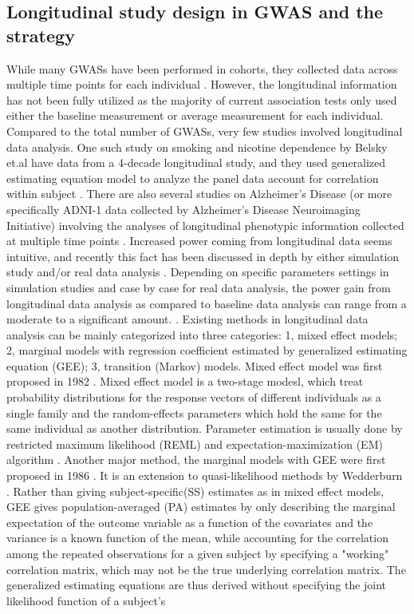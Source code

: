 \documentclass[12pt]{article}
\begin{document}
\subsection*{Longitudinal study design in GWAS and the strategy}
While many GWASs have been performed in cohorts, they collected data across multiple time points for each individual \cite{Aulchenko2009,Ionita-Laza2007,Kamatani2010,Kathiresan2007,Sabatti2008}. However, the longitudinal information has not been fully utilized as the majority of current association tests only used either the baseline measurement or average measurement for each individual\cite{Sabatti2008,Ionita-Laza2007,Kamatani2010,Kathiresan2007}. Compared to the total number of GWASs, very few studies involved longitudinal data analysis. One such study on smoking and nicotine dependence by Belsky et.al have data from a 4-decade longitudinal study, and they used generalized estimating equation model to analyze the panel data account for correlation within subject \cite{Belsky2013}. There are also several studies on Alzheimer's Disease (or more specifically ADNI-1 data collected by Alzheimer's Disease Neuroimaging Initiative) involving the analyses of longitudinal phenotypic information collected at multiple time points \cite{Wang2012,Melville2012,Silver2012}. Increased power coming from longitudinal data seems intuitive, and recently this fact has been discussed in depth by either simulation study and/or real data analysis \cite{Xu2014,Furlotte2012}. Depending on specific parameters settings in simulation studies and case by case for real data analysis, the power gain from longitudinal data analysis as compared to baseline data analysis can range from a moderate to a significant amount. \cite{Xu2014,Furlotte2012}. Existing methods in longitudinal data analysis can be mainly categorized into three categories: 1, mixed effect models; 2, marginal models with regression coefficient estimated by generalized estimating equation (GEE); 3, transition (Markov) models. Mixed effect model was first proposed in 1982 \cite{laird1982random}. Mixed effect model is a two-stage modesl, which treat probability distributions for the response vectors of different individuals as a single family and the random-effects parameters which hold the same for the same individual as another distribution. Parameter estimation is usually done by restricted maximum likelihood (REML) and expectation-maximization (EM) algorithm \cite{laird1982random}. Another major method, the marginal models with GEE were first proposed in 1986 \cite{zeger1986longitudinal,liang1986longitudinal}. It is an extension to quasi-likelihood methods by Wedderburn \cite{wedderburn1974quasi}. Rather than giving subject-specific(SS) estimates as in mixed effect models, GEE gives population-averaged (PA) estimates by only describing the marginal expectation of the outcome variable as a function of the covariates and the variance is a known function of the mean, while accounting for the correlation among the repeated observations for a given subject by specifying a "working" correlation matrix, which may not be the true underlying correlation matrix. The generalized estimating equations are thus derived without specifying the joint likelihood function of a subject's 
\end{document}
